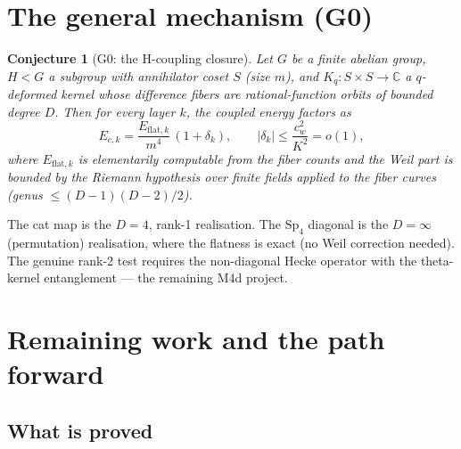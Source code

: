 \documentclass[11pt]{article}
\newtheorem{conjecture}[theorem]{Conjecture}
\begin{document}
\section{The general mechanism (G0)}\label{sec:g0}

\begin{conjecture}[G0: the H-coupling closure]\label{conj:G0}
Let $G$ be a finite abelian group, $H < G$ a subgroup with
annihilator coset $S$ (size $m$), and $K_q: S \times S \to
\mathbb{C}$ a $q$-deformed kernel whose difference fibers are
rational-function orbits of bounded degree $D$.  Then for every
layer $k$, the coupled energy factors as
\[
  E_{c,k} = \frac{E_{\mathrm{flat},k}}{m^4}\,(1 + \delta_k),
  \qquad |\delta_k| \le \frac{c_w^2}{K^2} = o(1),
\]
where $E_{\mathrm{flat},k}$ is elementarily computable from the
fiber counts and the Weil part is bounded by the Riemann hypothesis
over finite fields applied to the fiber curves (genus $\le (D{-}1)(D{-}2)/2$).
\end{conjecture}

The cat map is the $D = 4$, rank-1 realisation.  The $\mathrm{Sp}_4$
diagonal is the $D = \infty$ (permutation) realisation, where the
flatness is exact (no Weil correction needed).  The genuine rank-2
test requires the non-diagonal Hecke operator with the theta-kernel
entanglement — the remaining M4d project.

\section{Remaining work and the path forward}\label{sec:remaining}

\subsection{What is proved}
\end{document}
